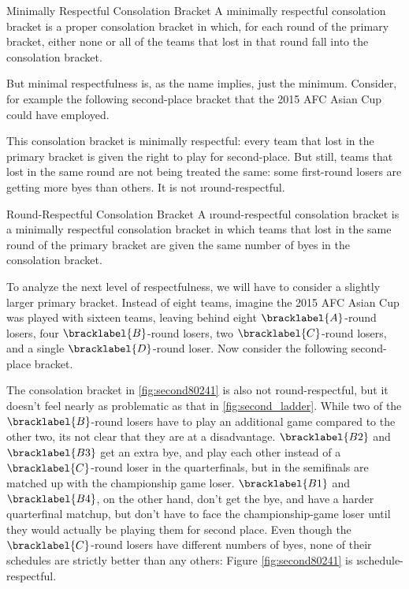 {    \begin{definition}{Minimally Respectful Consolation Bracket}{}
        A \i{minimally respectful} consolation bracket is a proper consolation bracket in which, for each round of the primary bracket, either none or all of the teams that lost in that round fall into the consolation bracket.
    \end{definition}

    But minimal respectfulness is, as the name implies, just the minimum. Consider, for example the following second-place bracket that the 2015 AFC Asian Cup could have employed.


    This consolation bracket is minimally respectful: every team that lost in the primary bracket is given the right to play for second-place. But still, teams that lost in the same round are not being treated the same: some first-round losers are getting more byes than others. It is not \i{round-respectful}.

    \begin{definition}{Round-Respectful Consolation Bracket}{}
        A \i{round-respectful} consolation bracket is a minimally respectful consolation bracket in which teams that lost in the same round of the primary bracket are given the same number of byes in the consolation bracket.
    \end{definition}

    To analyze the next level of respectfulness, we will have to consider a slightly larger primary bracket. Instead of eight teams, imagine the 2015 AFC Asian Cup was played with sixteen teams, leaving behind eight $\bracklabel{A}$-round losers, four $\bracklabel{B}$-round losers, two $\bracklabel{C}$-round losers, and a single $\bracklabel{D}$-round loser. Now consider the following second-place bracket.


    The consolation bracket in \ref{fig:second80241} is also not round-respectful, but it doesn't feel nearly as problematic as that in \ref{fig:second_ladder}. While two of the $\bracklabel{B}$-round losers have to play an additional game compared to the other two, its not clear that they are at a disadvantage. $\bracklabel{B2}$ and $\bracklabel{B3}$ get an extra bye, and play each other instead of a $\bracklabel{C}$-round loser in the quarterfinals, but in the semifinals are matched up with the championship game loser. $\bracklabel{B1}$ and $\bracklabel{B4}$, on the other hand, don't get the bye, and have a harder quarterfinal matchup, but don't have to face the championship-game loser until they would actually be playing them for second place. Even though the $\bracklabel{C}$-round losers have different numbers of byes, none of their schedules are strictly better than any others: Figure \ref{fig:second80241} is \i{schedule-respectful}.

}
